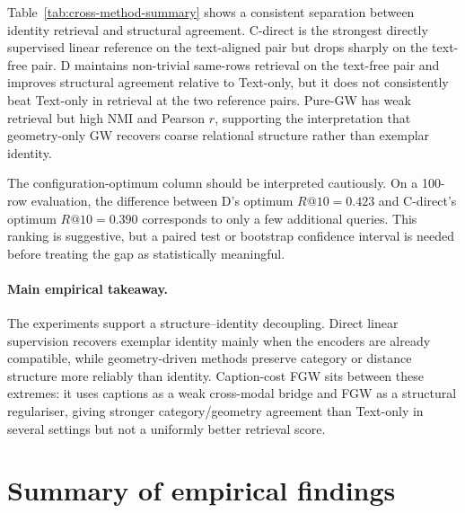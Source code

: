 Table~\ref{tab:cross-method-summary} shows a consistent separation
between identity retrieval and structural agreement. C-direct is the
strongest directly supervised linear reference on the text-aligned pair
but drops sharply on the text-free pair. D maintains non-trivial
same-rows retrieval on the text-free pair and improves structural
agreement relative to Text-only, but it does not consistently beat
Text-only in retrieval at the two reference pairs. Pure-GW has weak
retrieval but high NMI and Pearson $r$, supporting the interpretation
that geometry-only GW recovers coarse relational structure rather than
exemplar identity.

The configuration-optimum column should be interpreted cautiously. On a
100-row evaluation, the difference between D's optimum $R@10=0.423$ and
C-direct's optimum $R@10=0.390$ corresponds to only a few additional
queries. This ranking is suggestive, but a paired test or bootstrap
confidence interval is needed before treating the gap as statistically
meaningful.

\paragraph{Main empirical takeaway.}
The experiments support a structure--identity decoupling. Direct linear
supervision recovers exemplar identity mainly when the encoders are
already compatible, while geometry-driven methods preserve category or
distance structure more reliably than identity. Caption-cost FGW sits
between these extremes: it uses captions as a weak cross-modal bridge
and FGW as a structural regulariser, giving stronger category/geometry
agreement than Text-only in several settings but not a uniformly better
retrieval score.


\section{Summary of empirical findings}
\label{sec:res-summary}

